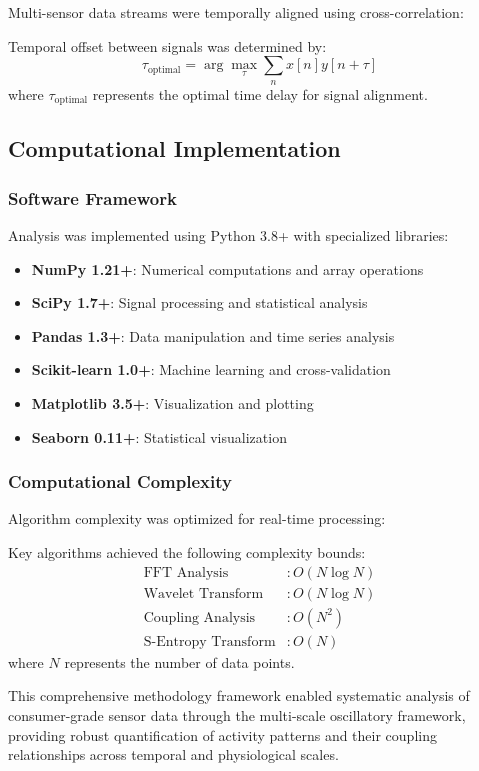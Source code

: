 Multi-sensor data streams were temporally aligned using cross-correlation:

\begin{definition}
Temporal offset between signals was determined by:
\begin{equation}
\tau_{\text{optimal}} = \arg\max_\tau \sum_{n} x[n] y[n+\tau]
\end{equation}
where $\tau_{\text{optimal}}$ represents the optimal time delay for signal alignment.
\end{definition}

\subsection{Computational Implementation}

\subsubsection{Software Framework}

Analysis was implemented using Python 3.8+ with specialized libraries:

\begin{itemize}
\item \textbf{NumPy 1.21+}: Numerical computations and array operations
\item \textbf{SciPy 1.7+}: Signal processing and statistical analysis
\item \textbf{Pandas 1.3+}: Data manipulation and time series analysis
\item \textbf{Scikit-learn 1.0+}: Machine learning and cross-validation
\item \textbf{Matplotlib 3.5+}: Visualization and plotting
\item \textbf{Seaborn 0.11+}: Statistical visualization
\end{itemize}

\subsubsection{Computational Complexity}

Algorithm complexity was optimized for real-time processing:

\begin{definition}
Key algorithms achieved the following complexity bounds:
\begin{align}
\text{FFT Analysis} &: O(N \log N) \\
\text{Wavelet Transform} &: O(N \log N) \\
\text{Coupling Analysis} &: O(N^2) \\
\text{S-Entropy Transform} &: O(N)
\end{align}
where $N$ represents the number of data points.
\end{definition}

This comprehensive methodology framework enabled systematic analysis of consumer-grade sensor data through the multi-scale oscillatory framework, providing robust quantification of activity patterns and their coupling relationships across temporal and physiological scales.
